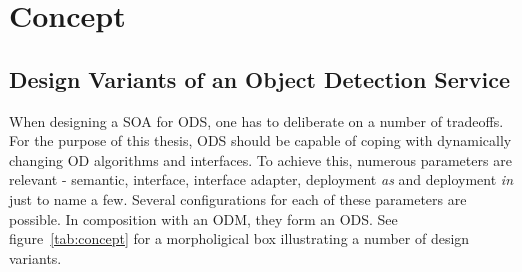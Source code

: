 \chapter{Concept\label{cha:chapter4}}
\section{Design Variants of an Object Detection Service}
\label{sec:concecptOverview}
When designing a SOA for ODS, one has to deliberate on a number of tradeoffs. For the purpose of this thesis, ODS should be capable of coping with dynamically changing OD algorithms and interfaces. To achieve this, numerous parameters are relevant - semantic, interface, interface adapter, deployment \textit{as} and deployment \textit{in} just to name a few. Several configurations for each of these parameters are possible. In composition with an ODM, they form an ODS. See figure~\ref{tab:concept} for a morpholigical box illustrating a number of design variants.

